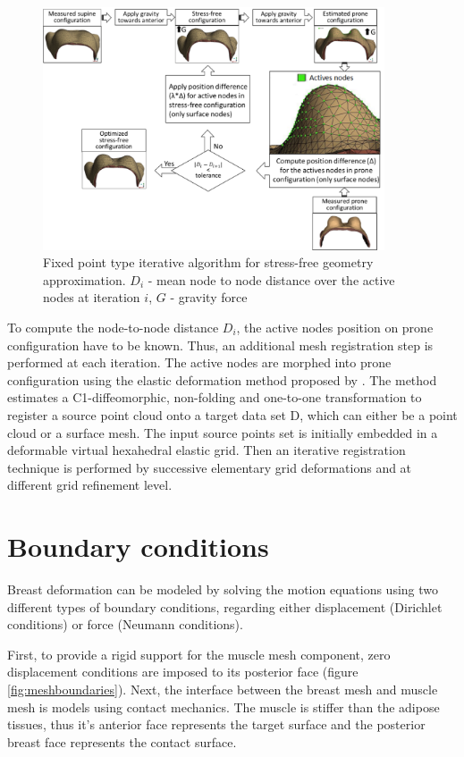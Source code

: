 \begin{figure}[!h]
\centering
\includegraphics[width=0.9\textwidth,keepaspectratio]{figures/stress_free_config_algo.png} 
\caption{Fixed point type iterative algorithm for stress-free geometry approximation. $D_i$ - mean node to node distance over the active nodes at iteration $i$, $G$ - gravity force}\label{fig:myfixedpointalgo}
\end{figure}

To compute the node-to-node distance $D_i$, the active nodes position on prone configuration have to be known. Thus, an additional mesh registration step is performed at each iteration. The active nodes are morphed into prone configuration using the elastic deformation method proposed by \cite{bucki_fast_2010}. The method estimates a C1-diffeomorphic, non-folding and one-to-one transformation to register a source point cloud onto a target data set D, which can either be a point cloud or a surface mesh.  The input source points set is initially embedded in a deformable virtual hexahedral elastic grid. Then an iterative registration technique is performed by successive elementary grid deformations and at different grid refinement level. 

\section{Boundary conditions}\label{section:myBoundayconditions}

Breast deformation can be modeled by solving the
motion equations using two different types of boundary
conditions, regarding either displacement (Dirichlet conditions) or force (Neumann conditions).

First, to provide a rigid support for the muscle mesh component, zero displacement conditions are imposed to its posterior face  (figure \ref{fig:meshboundaries}). Next, the interface between the breast mesh and muscle mesh is models using contact mechanics. The muscle is stiffer than the adipose tissues, thus it's anterior face represents the target surface and the posterior breast face represents the contact surface. 

